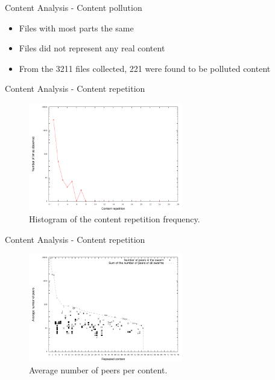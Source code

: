 \documentclass{beamer}
\begin{document}
\begin{frame}{Content Analysis - Content pollution}

\begin{itemize}
\addtolength{\itemsep}{1\baselineskip}
\item
    Files with most parts the same
\item
    Files did not represent any real content
\item
   From the 3211 files collected, 221 were found to be polluted content

\end{itemize}

\end{frame}


\begin{frame}{Content Analysis - Content repetition}

\begin{figure}[h]
\includegraphics[height=1.85in]{figures/NumContentPerSome}
\caption{Histogram of the content repetition frequency.}
\label{ctrep:2} 
\end{figure}

\end{frame}


\begin{frame}{Content Analysis - Content repetition}

\begin{figure}[h]
\includegraphics[height=1.85in]{figures/PeersPerContent}
\caption{Average number of peers per content.}
\label{ctrep:3} 
\end{figure}

\end{frame}
\end{document}
